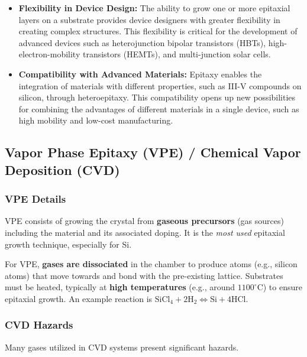 \documentclass{report}
\begin{document}
\begin{itemize}
    \item \textbf{Flexibility in Device Design:} 
    The ability to grow one or more epitaxial layers on a substrate provides device designers with greater flexibility in creating complex structures. This flexibility is critical for the development of advanced devices such as heterojunction bipolar transistors (HBTs), high-electron-mobility transistors (HEMTs), and multi-junction solar cells.

    \item \textbf{Compatibility with Advanced Materials:} 
    Epitaxy enables the integration of materials with different properties, such as III-V compounds on silicon, through heteroepitaxy. This compatibility opens up new possibilities for combining the advantages of different materials in a single device, such as high mobility and low-cost manufacturing.

\end{itemize}


\subsection{Vapor Phase Epitaxy (VPE) / Chemical Vapor Deposition (CVD)}

\subsubsection{VPE Details}
VPE consists of growing the crystal from \textbf{gaseous precursors} (gas sources) including the material and its associated doping. It is the \textit{most used} epitaxial growth technique, especially for Si.

For VPE, \textbf{gases are dissociated} in the chamber to produce atoms (e.g., silicon atoms) that move towards and bond with the pre-existing lattice. Substrates must be heated, typically at \textbf{high temperatures} (e.g., around $1100^{\circ}\text{C}$) to ensure epitaxial growth. An example reaction is $\text{SiCl}_4 + 2\text{H}_2 \Leftrightarrow \text{Si} + 4\text{HCl}$.

\subsubsection{CVD Hazards}
Many gases utilized in CVD systems present significant hazards.
\end{document}

